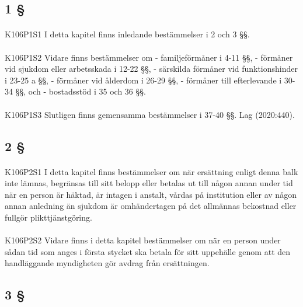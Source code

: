 \documentclass[a4paper,notitlepage,openany,10pt]{book}
\begin{document}
\subsection*{1 §}
\paragraph*{}
{\tiny K106P1S1}
I detta kapitel finns inledande bestämmelser i 2 och 3 §§.
\paragraph*{}
{\tiny K106P1S2}
Vidare finns bestämmelser om
\newline - familjeförmåner i 4-11 §§,
\newline - förmåner vid sjukdom eller arbetsskada i 12-22 §§,
\newline - särskilda förmåner vid funktionshinder i 23-25 a §§,
\newline - förmåner vid ålderdom i 26-29 §§,
\newline - förmåner till efterlevande i 30-34 §§, och
\newline - bostadsstöd i 35 och 36 §§.
\paragraph*{}
{\tiny K106P1S3}
Slutligen finns gemensamma bestämmelser i 37-40 §§.
Lag (2020:440).
\subsection*{2 §}
\paragraph*{}
{\tiny K106P2S1}
I detta kapitel finns bestämmelser om när ersättning enligt denna balk inte lämnas, begränsas till sitt belopp eller betalas ut till någon annan under tid när en person är häktad, är intagen i anstalt, vårdas på institution eller av någon annan anledning än sjukdom är omhändertagen på det allmännas bekostnad eller fullgör plikttjänstgöring.
\paragraph*{}
{\tiny K106P2S2}
Vidare finns i detta kapitel bestämmelser om när en person under sådan tid som anges i första stycket ska betala för sitt uppehälle genom att den handläggande myndigheten gör avdrag från ersättningen.
\subsection*{3 §}
\end{document}
